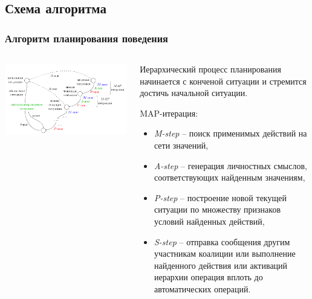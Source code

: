 \documentclass[default]{beamer}
\begin{document}
	\subsection{Схема алгоритма}
	\begin{frame}
		\frametitle{Алгоритм планирования поведения}
		
		\begin{columns}
			\begin{column}{0.6\textwidth}
				\includegraphics[width=\textwidth]{algo/ru/beh_plan2_ru}
				\vspace{20pt}
				\nocite{*}
				\printbibliography[keyword={plan}, resetnumbers=true]
			\end{column}
			\begin{column}{0.4\textwidth}
				\scriptsize
				Иерархический процесс планирования начинается с конченой ситуации и стремится достичь начальной ситуации.
				\par\bigskip
				MAP-итерация:
				\begin{itemize}
					\item \textit{M-step} -- поиск применимых действий на сети значений,
					\item \textit{A-step} -- генерация личностных смыслов, соответствующих найденным значениям,
					\item \textit{P-step} -- построение новой текущей ситуации по множеству признаков условий найденных действий,
					\item \textit{S-step} -- отправка сообщения другим участникам коалиции или выполнение найденного действия или активаций иерархии операция вплоть до автоматических операций.
				\end{itemize}
			\end{column}
		\end{columns}
		
	\end{frame}		
	
\end{document}
